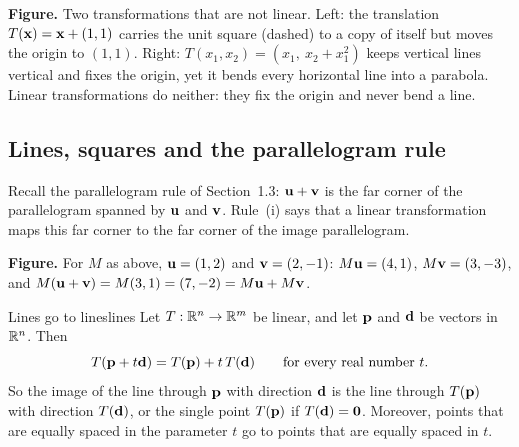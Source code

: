 \documentclass[11pt]{article}
\begin{document}
\textbf{Figure.} Two transformations that are not linear. Left: the translation $T(\mathbf{x})=\mathbf{x}+(1,1)$ carries the unit square (dashed) to a copy of itself but moves the origin to $(1,1)$. Right: $T(x_1,x_2)=(x_1,\ x_2+x_1^2)$ keeps vertical lines vertical and fixes the origin, yet it bends every horizontal line into a parabola. Linear transformations do neither: they fix the origin and never bend a line.

\subsection*{Lines, squares and the parallelogram rule}

Recall the parallelogram rule of Section~1.3: $\mathbf{u}+\mathbf{v}$ is the far corner of the parallelogram spanned by $\mathbf{u}$ and $\mathbf{v}$. Rule~(i) says that a linear transformation maps this far corner to the far corner of the image parallelogram.

\begin{center}
\end{center}

\textbf{Figure.} For $M$ as above, $\mathbf{u}=(1,2)$ and $\mathbf{v}=(2,-1)$: $M\mathbf{u}=(4,1)$, $M\mathbf{v}=(3,-3)$, and $M(\mathbf{u}+\mathbf{v})=M(3,1)=(7,-2)=M\mathbf{u}+M\mathbf{v}$.

\begin{thm}{Lines go to lines}{lines}
Let $T:\mathbb{R}^n\to\mathbb{R}^m$ be linear, and let $\mathbf{p}$ and $\mathbf{d}$ be vectors in $\mathbb{R}^n$. Then
\[
T(\mathbf{p}+t\mathbf{d})=T(\mathbf{p})+t\,T(\mathbf{d})\qquad\text{for every real number }t.
\]
So the image of the line through $\mathbf{p}$ with direction $\mathbf{d}$ is the line through $T(\mathbf{p})$ with direction $T(\mathbf{d})$, or the single point $T(\mathbf{p})$ if $T(\mathbf{d})=\mathbf{0}$. Moreover, points that are equally spaced in the parameter $t$ go to points that are equally spaced in $t$.
\end{thm}
\end{document}
